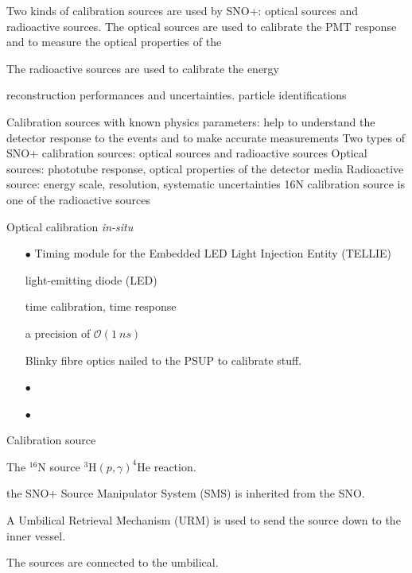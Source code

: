 Two kinds of calibration sources are used by SNO+: optical sources and radioactive sources. 
The optical sources are used to calibrate the PMT response and to measure the optical properties of the 


The radioactive sources are used to calibrate the energy 

reconstruction performances and uncertainties.
particle identifications



Calibration sources with known physics parameters: help to
understand the detector response to the events and to make
accurate measurements
Two types of SNO+ calibration sources: optical sources and
radioactive sources
Optical sources: phototube response, optical properties of the
detector media
Radioactive source: energy scale, resolution, systematic
uncertainties
16N calibration source is one of the radioactive sources


\cite{esteban2019global}




Optical calibration  {\emph {in-situ}} 
\begin{itemize}  
	\item[$\bullet$] Timing module for the Embedded LED Light Injection Entity (TELLIE)
	
	light-emitting diode (LED)
	
	
	time calibration, time response 
	
	a precision of $\mathcal{O} (1~ns)$
	
	Blinky fibre optics nailed to the PSUP to calibrate stuff.
	
	
	
	\item[$\bullet$]  
	
	
	\item[$\bullet$] 
\end{itemize}





Calibration source

The $^{16}$N source
$^{3}$H$(p,\gamma)^{4}$He reaction.

the SNO+ Source Manipulator System (SMS)
is inherited from the SNO.



A Umbilical Retrieval Mechanism (URM) is used to send the source down to the inner vessel.



The sources are connected to the umbilical.


